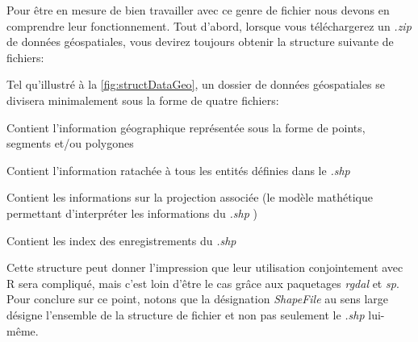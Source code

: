 \noindent
Pour être en mesure de bien travailler avec ce genre de fichier nous devons en comprendre leur fonctionnement. Tout d'abord, lorsque vous téléchargerez un \emph{.zip} de données géospatiales, vous devirez toujours obtenir la structure suivante de fichiers: \\


\noindent
Tel qu'illustré à la \autoref{fig:structDataGeo}, un dossier de données géospatiales se divisera minimalement sous la forme de quatre fichiers:
\begin{description}[style=multiline,leftmargin=1.5cm]
	\item[\emph{.shp}] Contient l'information géographique représentée sous la forme de points, segments et/ou polygones
	\item[\emph{.dbf}] Contient l'information ratachée à tous les entités définies dans le \emph{.shp}
	\item[\emph{.prj}] Contient les informations sur la projection associée (le modèle mathétique permettant d'interpréter les informations du \emph{.shp} \cite{projectionSIG})
	\item[{.shx}] Contient les index des enregistrements du \emph{.shp}
\end{description}
Cette structure peut donner l'impression que leur utilisation conjointement avec R sera compliqué, mais c'est loin d'être le cas grâce aux paquetages \emph{rgdal} et \emph{sp}. Pour conclure sur ce point, notons que la désignation \emph{ShapeFile} au sens large désigne l'ensemble de la structure de fichier et non pas seulement le \emph{.shp} lui-même. \cite{portailSIG} \\

